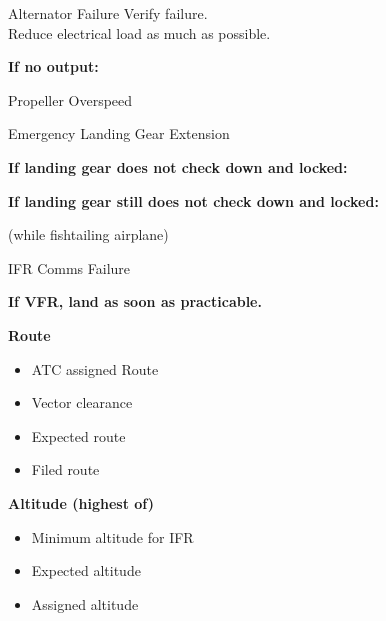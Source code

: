 \begin{checklist_emerg}{Alternator Failure}
    Verify failure. 
    \\
    Reduce electrical load as much as possible.
    \\
    \begin{center}
        \textbf{If no output:}
    \end{center}
\end{checklist_emerg}

\begin{checklist_emerg}{Propeller Overspeed}
\end{checklist_emerg}

\begin{checklist_emerg}{Emergency Landing Gear Extension}
    \begin{center}
        \textbf{If landing gear does not check down and locked:}
    \end{center}
    \begin{center}
        \textbf{If landing gear still does not check down and locked:}
    \end{center}
    \begin{center}
        (while fishtailing airplane)
    \end{center}
\end{checklist_emerg}

\begin{checklist_emerg}{IFR Comms Failure}

    \begin{center}
        \textbf{If VFR, land as soon as practicable.}
    \end{center}

    \textbf{Route}
    \begin{itemize}[noitemsep]
        \item ATC assigned Route
        \item Vector clearance
        \item Expected route
        \item Filed route
    \end{itemize}

    \textbf{Altitude (highest of)}
    \begin{itemize}[noitemsep]
        \item Minimum altitude for IFR
        \item Expected altitude
        \item Assigned altitude
    \end{itemize}
\end{checklist_emerg}

\onecolumn
